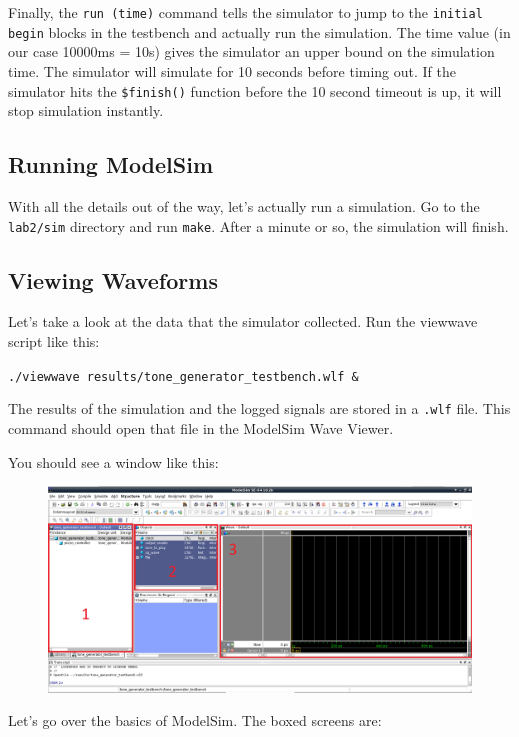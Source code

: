 \documentclass[11pt]{article}
\begin{document}
Finally, the \verb|run (time)| command tells the simulator to jump to the \verb|initial begin| blocks in the testbench and actually run the simulation. The time value (in our case 10000ms = 10s) gives the simulator an upper bound on the simulation time. The simulator will simulate for 10 seconds before timing out. If the simulator hits the \verb|$finish()| function before the 10 second timeout is up, it will stop simulation instantly.

\subsection{Running ModelSim}

With all the details out of the way, let's actually run a simulation. Go to the \verb|lab2/sim| directory and run \verb|make|. After a minute or so, the simulation will finish.

\subsection{Viewing Waveforms}

Let's take a look at the data that the simulator collected. Run the viewwave script like this:

\verb|./viewwave results/tone_generator_testbench.wlf &|

The results of the simulation and the logged signals are stored in a \verb|.wlf| file. This command should open that file in the ModelSim Wave Viewer.

You should see a window like this:

\begin{figure}[H]
	\centerline{\includegraphics[width=\textwidth]{images/modelsim_new.png}}
\end{figure}

Let's go over the basics of ModelSim. The boxed screens are:
\end{document}

